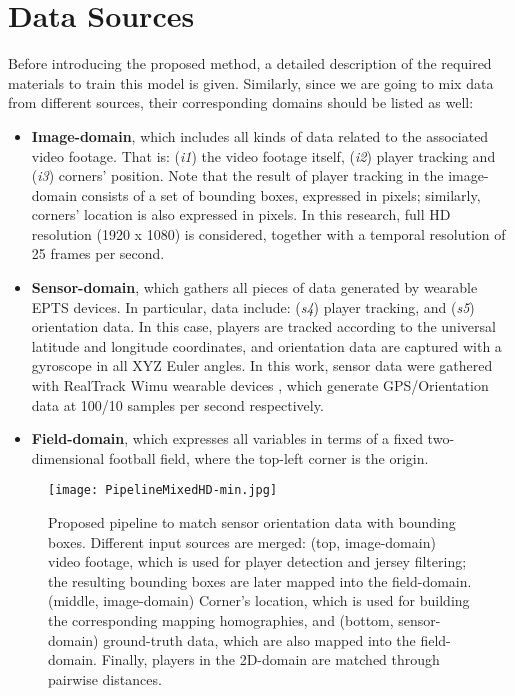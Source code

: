 \documentclass{article}
\begin{document}
\section{Data Sources} \label{sec:data}
Before introducing the proposed method, a detailed description of the required materials to train this model is given. Similarly, since we are going to mix data from different sources, their corresponding domains should be listed as well: 
\begin{itemize}
    \item \textbf{Image-domain}, which includes all kinds of data related to the associated video footage. That is: (\textit{i1}) the video footage itself, (\textit{i2}) player tracking and (\textit{i3})  corners' position. Note that the result of player tracking in the image-domain consists of a set of bounding boxes, expressed in pixels; similarly, corners' location is also expressed in pixels. In this research, full HD resolution (1920 x 1080) is considered, together with a temporal resolution of 25 frames per second.
    \item \textbf{Sensor-domain}, which gathers all pieces of data generated by wearable EPTS devices. In particular, data include: (\textit{s4}) player tracking, and (\textit{s5}) orientation data. In this case, players are tracked according to the universal latitude and longitude coordinates, and orientation data are captured with a gyroscope in all XYZ Euler angles. In this work, sensor data were gathered with RealTrack Wimu wearable devices \cite{realtrack}, which generate GPS/Orientation data at 100/10 samples per second respectively. 
    \item \textbf{Field-domain}, which expresses all variables in terms of a fixed two-dimensional football field, where the top-left corner is the origin.
\end{itemize}

\begin{figure*}
\begin{center}
  \texttt{[image: PipelineMixedHD-min.jpg]}
  \caption{Proposed pipeline to match sensor orientation data with bounding boxes. Different input sources are merged: (top, image-domain) video footage, which is used for player detection and jersey filtering; the resulting bounding boxes are later mapped into the field-domain. (middle, image-domain) Corner's location, which is used for building the corresponding mapping homographies, and (bottom, sensor-domain) ground-truth data, which are also mapped into the field-domain. Finally, players in the 2D-domain are matched through pairwise distances.}
  \label{fig:pip1}
 \end{center}
\end{figure*}
\end{document}
